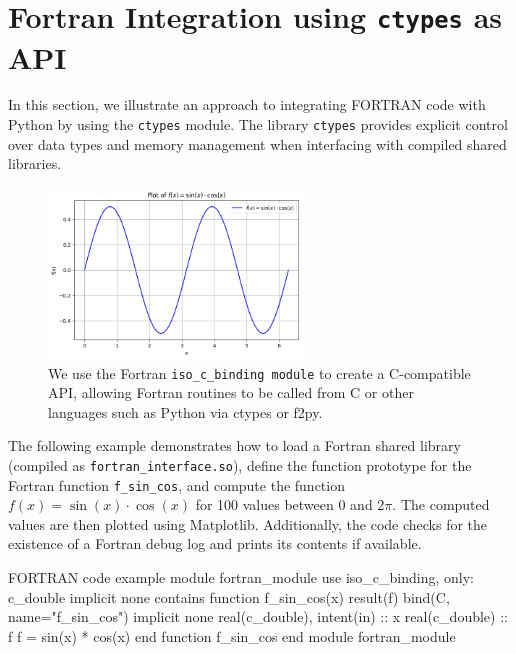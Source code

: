 %
\section{Fortran Integration using \texttt{ctypes} as API}

In this section, we illustrate an approach to integrating FORTRAN code with Python by using the \texttt{ctypes} module. The library \texttt{ctypes} provides explicit control over data types and memory management when interfacing with compiled shared libraries.

\begin{center}
\begin{figure}[ht]
   \centerline{\includegraphics[width=0.6\textwidth]{images/sin_cos.png}}
	\caption{We use the Fortran \texttt{iso\_c\_binding module} to create a C-compatible API, allowing Fortran routines to be called from C or other languages such as Python via ctypes or f2py.}
\end{figure}
\end{center}%

The following example demonstrates how to load a Fortran shared library (compiled as \linebreak\texttt{fortran\_interface.so}), define the function prototype for the Fortran function \texttt{f\_sin\_cos}, and compute the function \( f(x) = \sin(x) \cdot \cos(x) \) for 100 values between 0 and \(2\pi\). The computed values are then plotted using Matplotlib. Additionally, the code checks for the existence of a Fortran debug log and prints its contents if available.

\begin{codeonly}{FORTRAN code example}
module fortran_module
    use iso_c_binding, only: c_double
    implicit none
contains
    function f_sin_cos(x) result(f) bind(C, name="f_sin_cos")
        implicit none
        real(c_double), intent(in) :: x
        real(c_double) :: f
        f = sin(x) * cos(x)
    end function f_sin_cos
end module fortran_module
\end{codeonly}

